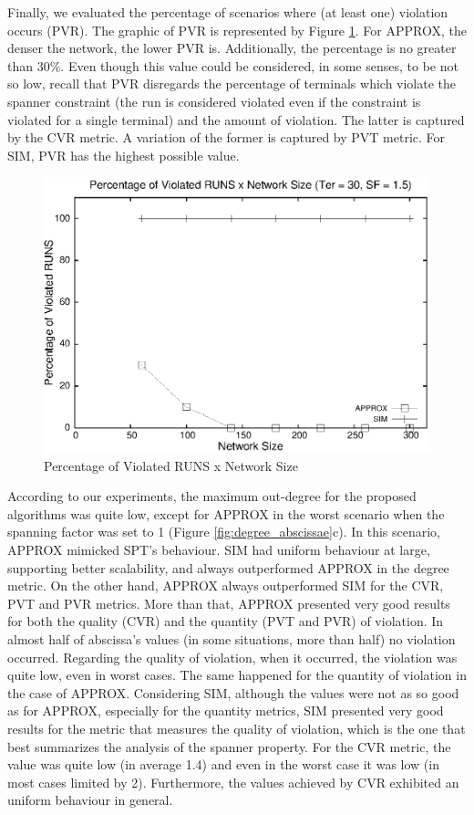 Finally, we evaluated the percentage of scenarios where (at least one) violation occurs (PVR). 
The graphic of PVR is represented by Figure \ref{fig:violated-runs_network-size}. For APPROX, the 
denser the network, the lower PVR is. Additionally, the percentage is no greater than 30\%. Even though this value could be considered, in some senses, to be not  
so low, recall that PVR disregards the percentage of terminals which violate the spanner constraint 
(the run is considered violated even if the constraint is violated for a single terminal) and the amount of violation. The latter is captured by the CVR metric. A variation of the former is captured by PVT metric.
For SIM, PVR has the highest possible value.

\begin{figure}[!th]
\centering
\includegraphics[scale=0.63]{imagens/percViolatedRUNS-ter30sf15}
\caption{Percentage of Violated RUNS x Network Size}
\label{fig:violated-runs_network-size}
\end{figure}

According to our experiments, the maximum out-degree for the proposed algorithms was quite low, except for APPROX in the 
worst scenario when the spanning factor was set to 1 (Figure \ref{fig:degree_abscissae}c). In this scenario, APPROX mimicked SPT's behaviour. 
SIM had uniform behaviour at large, supporting better scalability, and always outperformed APPROX 
in the degree metric. On the other hand, APPROX always outperformed SIM for the CVR, PVT and PVR metrics. More than that, APPROX 
presented very good results for both the quality (CVR) and the quantity (PVT and PVR) of violation. In almost half of abscissa's values (in some situations, more than half) 
no violation occurred. Regarding the quality of violation, when it occurred, the violation was quite low, even in worst cases. The same happened for the 
quantity of violation in the case of APPROX. Considering SIM, although the values were not as so good as for APPROX, 
especially for the quantity metrics, SIM presented very good results for the metric that measures the quality of violation, which is the one that best summarizes 
the analysis of the spanner property. For the CVR metric, the value was quite low (in average 1.4) and even in the worst case it was low (in most cases limited by 2). Furthermore, the values achieved by CVR exhibited an uniform behaviour in general.

